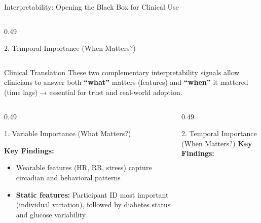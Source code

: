 \documentclass[aspectratio=169,xcolor=dvipsnames]{beamer}
\begin{document}
\begin{frame}{Interpretability: Opening the Black Box for Clinical Use}
\begin{columns}[T]
\begin{column}{0.49\textwidth}
\begin{block}{2. Temporal Importance (When Matters?)}
\begin{itemize}
                \end{itemize}
            \end{block}
        \end{column}
    \end{columns}
    
    \vspace{0.8em}
    \begin{alertblock}{Clinical Translation}
        These two complementary interpretability signals allow clinicians to answer both \textbf{``what''} matters (features) and \textbf{``when''} it mattered (time lags) → essential for trust and real-world adoption.
    \end{alertblock}
\end{frame}

\begin{frame}
    
    \begin{columns}[T]   %
        \begin{column}{0.49\textwidth}
            \begin{block}{1. Variable Importance (What Matters?)}
              
                \vspace{0.5em}
                \textbf{Key Findings:}
                \begin{itemize}
                
                    \item Wearable features (HR, RR, stress) capture circadian and behavioral patterns
                    \item \textbf{Static features:} Participant ID most important (individual variation), followed by diabetes status and glucose variability
                \end{itemize}
            \end{block}
        \end{column}
        \hfill
        \begin{column}{0.49\textwidth}
            \begin{block}{2. Temporal Importance (When Matters?)}
                \textbf{Key Findings:}
                \begin{itemize}
                    

\end{itemize}
\end{block}
\end{column}
\end{columns}
\end{frame}
\end{document}
